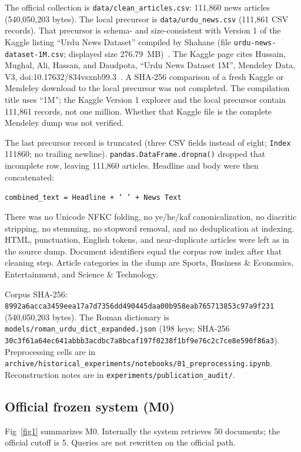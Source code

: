 \documentclass[10pt,letterpaper]{article}
\begin{document}
The official collection is \texttt{data/clean\_articles.csv}: 111,860 news articles (540,050,203 bytes). The local precursor is \texttt{data/urdu\_news.csv} (111,861 CSV records). That precursor is schema- and size-consistent with Version 1 of the Kaggle listing ``Urdu News Dataset'' compiled by Shahane (file \texttt{urdu-news-dataset-1M.csv}; displayed size 276.79~MB)~\cite{bib17}. The Kaggle page cites Hussain, Mughal, Ali, Hassan, and Daudpota, ``Urdu News Dataset 1M'', Mendeley Data, V3, doi:10.17632/834vsxnb99.3~\cite{bib16}. A SHA-256 comparison of a fresh Kaggle or Mendeley download to the local precursor was not completed. The compilation title uses ``1M''; the Kaggle Version 1 explorer and the local precursor contain 111,861 records, not one million. Whether that Kaggle file is the complete Mendeley dump was not verified.

The last precursor record is truncated (three CSV fields instead of eight; \texttt{Index} 111860; no trailing newline). \texttt{pandas.DataFrame.dropna()} dropped that incomplete row, leaving 111,860 articles. Headline and body were then concatenated:

\texttt{combined\_text = Headline + ' ' + News Text}

There was no Unicode NFKC folding, no ye/he/kaf canonicalization, no diacritic stripping, no stemming, no stopword removal, and no deduplication at indexing. HTML, punctuation, English tokens, and near-duplicate articles were left as in the source dump. Document identifiers equal the corpus row index after that cleaning step. Article categories in the dump are Sports, Business \& Economics, Entertainment, and Science \& Technology.

Corpus SHA-256: \texttt{8992a6acca3459eea17a7d7356dd490445daa00b958eab765713853c97a9f231} (540,050,203 bytes). The Roman dictionary is \texttt{models/roman\_urdu\_dict\_expanded.json} (198 keys; SHA-256 \texttt{30c3f61a64ec641abbb3acdbc7a8bcaf197f0238f1bf9e76c2c7ce8e590f86a3}). Preprocessing cells are in \texttt{archive/historical\_experiments/notebooks/01\_preprocessing.ipynb}. Reconstruction notes are in \texttt{experiments/publication\_audit/}.

\subsection*{Official frozen system (M0)}

Fig~\ref{fig1} summarizes M0. Internally the system retrieves 50 documents; the official cutoff is 5. Queries are not rewritten on the official path.
\end{document}
